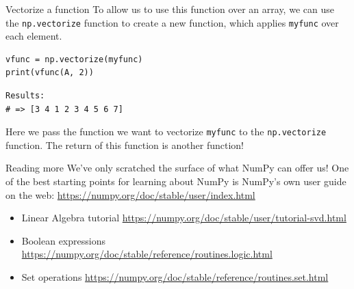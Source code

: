 \documentclass[10pt]{beamer}
\begin{document}
\begin{frame}[label={sec:orgf09e5f5},fragile]{Vectorize a function}
 To allow us to use this function over an array, we can use the \texttt{np.vectorize} function
to create a new function, which applies \texttt{myfunc} over each element.

\begin{verbatim}
vfunc = np.vectorize(myfunc)
print(vfunc(A, 2))
\end{verbatim}

\begin{verbatim}
Results: 
# => [3 4 1 2 3 4 5 6 7]
\end{verbatim}


Here we pass the function we want to vectorize \texttt{myfunc} to the \texttt{np.vectorize}
function. The return of this function is another function!
\end{frame}

\begin{frame}[label={sec:orgd5caa50}]{Reading more}
We've only scratched the surface of what NumPy can offer us! One of the best starting
points for learning about NumPy is NumPy's own user guide on the web: \url{https://numpy.org/doc/stable/user/index.html}

\begin{itemize}
\item Linear Algebra tutorial \url{https://numpy.org/doc/stable/user/tutorial-svd.html}
\item Boolean expressions \url{https://numpy.org/doc/stable/reference/routines.logic.html}
\item Set operations \url{https://numpy.org/doc/stable/reference/routines.set.html}
\end{itemize}
\end{frame}
\end{document}
